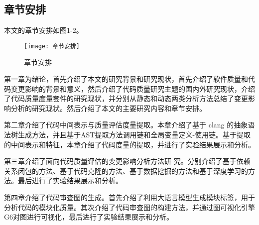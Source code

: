 \subsection{章节安排}

本文的章节安排如图1-2。

\begin{figure}[h]
\centering
\texttt{[image: 章节安排]}
\caption{章节安排}
\end{figure}

第一章为绪论，首先介绍了本文的研究背景和研究现状，首先介绍了软件质量和代码变更影响的背景和意义，然后介绍了代码质量研究主题的国内外研究现状，介绍了代码质量度量套件的研究现状，并分别从静态和动态两类分析方法总结了变更影响分析的研究现状。然后介绍了本文的主要研究内容和章节安排。

第二章介绍了代码中间表示与质量评估度量提取。本章介绍了基于 clang 的抽象语法树生成方法，并且基于AST提取方法调用链和全局变量定义-使用链。基于提取的中间表示和特征，本章介绍了代码度量的提取，并进行了实验结果展示和分析。

第三章介绍了面向代码质量评估的变更影响分析方法研
究。分别介绍了基于依赖关系闭包的方法、基于代码克隆的方法、基于数据挖掘的方法和基于深度学习的方法。最后进行了实验结果展示和分析。

第四章介绍了代码审查图的生成。首先介绍了利用大语言模型生成模块标签，用于分析代码的模块化质量。其次介绍了代码审查图的构建方法，并通过图可视化引擎G6对图进行可视化，最后进行了实验结果展示和分析。



